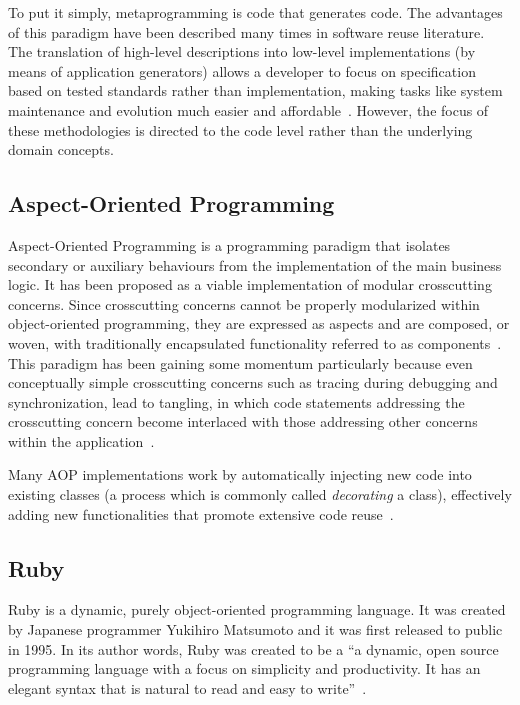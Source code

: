 To put it simply, metaprogramming is code that generates code. The advantages of this paradigm have been described many times in software reuse literature. The translation of high-level descriptions into low-level implementations (by means of application generators) allows a developer to focus on specification based on tested standards rather than implementation, making tasks like system maintenance and evolution much easier and affordable~\cite{Bas87, Cle88}. However, the focus of these methodologies is directed to the code level rather than the underlying domain concepts.

\subsection{Aspect-Oriented Programming}\label{sec:aspect_oriented_programming}

Aspect-Oriented Programming is a programming paradigm that isolates secondary or auxiliary behaviours from the implementation of the main business logic. It has been proposed as a viable implementation of modular crosscutting concerns. Since crosscutting concerns cannot be properly modularized within object-oriented programming, they are expressed as aspects and are composed, or woven, with traditionally encapsulated functionality referred to as components~\cite{KM05, Ste06}. This paradigm has been gaining some momentum particularly because even conceptually simple crosscutting concerns such as tracing during debugging and synchronization, lead to tangling, in which code statements addressing the crosscutting concern become interlaced with those addressing other concerns within the application~\cite{LC03}.

Many AOP implementations work by automatically injecting new code into existing classes (a process which is commonly called \emph{decorating} a class), effectively adding new functionalities that promote extensive code reuse~\cite{Ste06, LC03, metaclass_programming_in_python}.

\subsection{Ruby}\label{sec:ruby}

Ruby is a dynamic, purely object-oriented programming language. It was created by Japanese programmer Yukihiro Matsumoto and it was first released to public in 1995. In its author words, Ruby was created to be a ``a dynamic, open source programming language with a focus on simplicity and productivity. It has an elegant syntax that is natural to read and easy to write''~\cite{ruby}.


